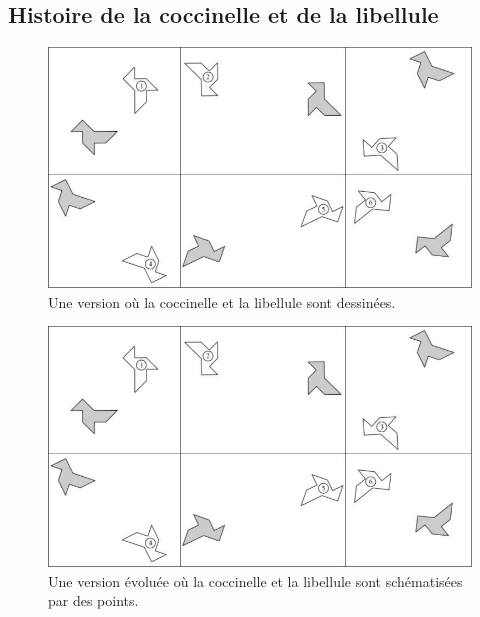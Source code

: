 \subsection{Histoire de la coccinelle et de la libellule}\label{annexe:angles-prod2}

\begin{figure}[h!]
    \centering
    \includegraphics[width=0.9\linewidth]{img/activitemepcc.jpg}
    \caption{Une version où la coccinelle et la libellule sont dessinées.}
    \label{fig:angles-fiche1}
\end{figure}

\begin{figure}[h!]
    \centering
    \includegraphics[width=0.9\linewidth]{img/activitemepcc.jpg}
    \caption{Une version évoluée où la coccinelle et la libellule sont schématisées par des points.}
    \label{fig:angles-fiche1}
\end{figure}